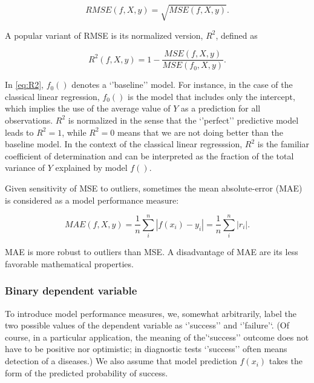 \documentclass[12pt,]{krantz}
\begin{document}
\begin{equation}
RMSE(f, X, y) = \sqrt{MSE(f, X, y)}.
\label{eq:RMSE}
\end{equation}

A popular variant of RMSE is its normalized version, \(R^2\), defined as

\begin{equation}
R^2(f, X, y) = 1 - \frac{MSE(f, X, y)}{MSE(f_0, X,y)}.
\label{eq:R2}
\end{equation}

In \eqref{eq:R2}, \(f_0()\) denotes a `'baseline'' model. For instance, in the case of the classical linear regression, \(f_0()\) is the model that includes only the intercept, which implies the use of the average value of \(Y\) as a prediction for all observations. \(R^2\) is normalized in the sense that the `'perfect'' predictive model leads to \(R^2 = 1\), while \(R^2 = 0\) means that we are not doing better than the baseline model. In the context of the classical linear regresssion, \(R^2\) is the familiar coefficient of determination and can be interpreted as the fraction of the total variance of \(Y\) explained by model \(f()\).

Given sensitivity of MSE to outliers, sometimes the mean absolute-error (MAE) is considered as a model performance measure:

\begin{equation}
MAE(f, X ,y) = \frac{1}{n} \sum_{i}^{n} |f(x_i) - y_i| = \frac{1}{n} \sum_{i}^{n} |r_i|.
\label{eq:MAE}
\end{equation}

MAE is more robust to outliers than MSE. A disadvantage of MAE are its less favorable mathematical properties.

\hypertarget{modelPerformanceMethodBin}{%
\subsubsection{Binary dependent variable}\label{modelPerformanceMethodBin}}

To introduce model performance measures, we, somewhat arbitrarily, label the two possible values of the dependent variable as `'success'' and `'failure'`. (Of course, in a particular application, the meaning of the'`success'' outcome does not have to be positive nor optimistic; in diagnostic tests `'success'' often means detection of a diseases.) We also assume that model prediction \(f(x_i)\) takes the form of the predicted probability of success.
\end{document}
